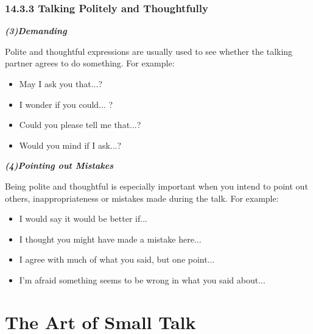 \documentclass[aspectratio=169,UTF8,c]{beamer}%
\begin{document}
\begin{frame}
	\frametitle{14.3.3 Talking Politely and Thoughtfully}
	\emph{\textbf{(3)Demanding}}
	
	Polite and thoughtful expressions are usually used to see whether the talking partner agrees to do something. For example:
	\begin{itemize}
		\item May I ask you that...?
		\item I wonder if you could... ?
		\item Could you please tell me that...?
		\item Would you mind if I ask...?
	\end{itemize}
	
	\emph{\textbf{(4)Pointing out Mistakes}}
	
	Being polite and thoughtful is especially important when you intend to point out others, inappropriateness or mistakes made during the talk. For example:
	\begin{itemize}
		\item I would say it would be better if...
		\item I thought you might have made a mistake here...
		\item I agree with much of what you said, but one point...
		\item I'm afraid something seems to be wrong in what you said about...
	\end{itemize}
\end{frame}

\section{The Art of Small Talk}
\end{document}
